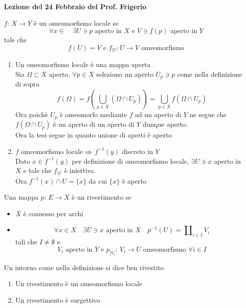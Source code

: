 	


\textbf{Lezione del 24 Febbraio del Prof. Frigerio}
\begin{defn}\bianco
$f:\, X \to Y$ \`e un omeomorfismo locale se 
$$ \forall x \in  \quad \exists U \ni p \text{ aperto in } X \text{ e } V \ni f(p) \text{ aperto in } Y $$
tale che 
$$ f(U)=V \text{ e } f_{\vert U} : U \to V \text{ omeomorfismo}$$
\end{defn}
\begin{fatti}\bbianco
\begin{enumerate}
\item Un omeomorfismo locale \`e una mappa aperta\\
Sia $\Omega \subset X $ aperto, $\forall p\in X$ seleziono un aperto $U_p \ni p $ come nella definizione di sopra
$$ f( \Omega) = f\left( \bigcup_{p\in X} ( \Omega\cap U_p) \right)= \bigcup_{p \in X} f(\Omega \cap U_p)$$
Ora poich\`e $U_p$ \`e omeomorfo mediante $f$ ad un aperto di $Y$ ne segue che $f(\Omega \cap U_p)$ \`e un aperto di un aperto di $Y$ dunque aperto.\\
Ora la tesi segue in quanto unione di aperti \`e aperto
\item $f$ omeomorfismo locale $\Rightarrow$ $f^{-1}(y)$ discreto in $Y$\\
Dato $x \in f^{-1}(y)$ per definizione di omeomorfismo locale, $\exists U \ni x $ aperto in $X$ e tale che $f_{\vert U} $ \`e iniettiva.\\
Ora $f^{-1}(x) \cap U=\{x \}$ da cui $\{ x \} $ \`e aperto
\end{enumerate}
\end{fatti}
\spazio
\begin{defn}[Rivestimento]\bianco
Una mappa $p:\, E \to X$ \`e un rivestimento se 
\begin{itemize}
\item $X$ \`e connesso per archi
\item 
$$ \forall x \in X \quad \exists U \ni x \text{ aperto in } X \quad p^{-1}(U) = \amalg_{i\in I} V_i$$
tali che $I \neq \emptyset$ e 
$$ V_i \text{ aperto in } Y \text{ e } p_{\vert V_i}:\, V_i \to U \text{ omeomorfismo } \forall i \in I$$

\end{itemize}
\end{defn}
\begin{defn}Un intorno come nella definizione si dice ben rivestito
\end{defn}
\begin{fatti}\bbianco
\begin{enumerate}
\item Un rivestimento \`e un omeomorfismo locale
\item Un rivestimento \`e surgettivo
\end{enumerate}
\end{fatti}


